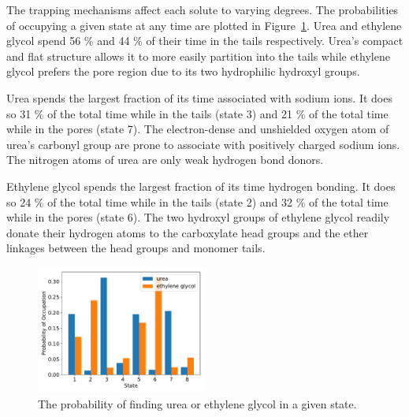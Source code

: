 \documentclass{article}
\begin{document}
  The trapping mechanisms affect each solute to varying degrees. The probabilities
  of occupying a given state at any time are plotted in Figure~\ref{fig:state_probabilities}.
  Urea and ethylene glycol spend 56 \% and 44 \% of their time in the tails
  respectively. Urea's compact and flat structure allows it to more easily 
  partition into the tails while ethylene glycol prefers the pore region due to 
  its two hydrophilic hydroxyl groups.
  
  Urea spends the largest fraction of its time associated with sodium ions.
  It does so 31 \% of the total time while in the tails (state 3) and 21 \%
  of the total time while in the pores (state 7). The electron-dense and 
  unshielded oxygen atom of urea's carbonyl group are prone to associate 
  with positively charged sodium ions. The nitrogen atoms of urea are only
  weak hydrogen bond donors.
  
  Ethylene glycol spends the largest fraction of its time hydrogen bonding.
  It does so 24 \% of the total time while in the tails (state 2) and 32 \% 
  of the total time while in the pores (state 6). The two hydroxyl groups 
  of ethylene glycol readily donate their hydrogen atoms to the carboxylate
  head groups and the ether linkages between the head groups and monomer tails. 
  
  \begin{figure}
  \centering
  \includegraphics[width=0.5\textwidth]{state_probabilities.pdf}
  \caption{The probability of finding urea or ethylene glycol in a given state.}\label{fig:state_probabilities}
  \end{figure}
  
  
  
\end{document}
